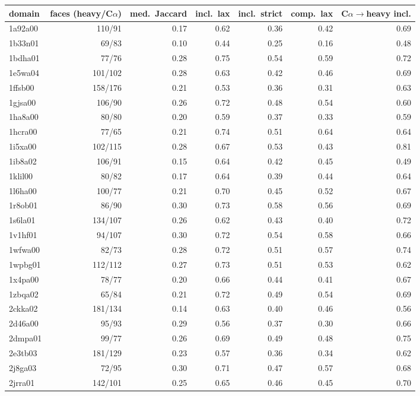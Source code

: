 \begin{table}[H]\centering\small\begin{tabular}{lrrrrrr}\toprule
domain & faces (heavy/C$\alpha$) & med.\ Jaccard & incl.\ lax & incl.\ strict & comp.\ lax & C$\alpha\to$heavy incl.\\\midrule
1a92a00 & 110/91 & 0.17 & 0.62 & 0.36 & 0.42 & 0.69\\
1b33n01 & 69/83 & 0.10 & 0.44 & 0.25 & 0.16 & 0.48\\
1bdha01 & 77/76 & 0.28 & 0.75 & 0.54 & 0.59 & 0.72\\
1e5wa04 & 101/102 & 0.28 & 0.63 & 0.42 & 0.46 & 0.69\\
1ffsb00 & 158/176 & 0.21 & 0.53 & 0.36 & 0.31 & 0.63\\
1gjsa00 & 106/90 & 0.26 & 0.72 & 0.48 & 0.54 & 0.60\\
1ha8a00 & 80/80 & 0.20 & 0.59 & 0.37 & 0.33 & 0.59\\
1hcra00 & 77/65 & 0.21 & 0.74 & 0.51 & 0.64 & 0.64\\
1i5xa00 & 102/115 & 0.28 & 0.67 & 0.53 & 0.43 & 0.81\\
1ib8a02 & 106/91 & 0.15 & 0.64 & 0.42 & 0.45 & 0.49\\
1klil00 & 80/82 & 0.17 & 0.64 & 0.39 & 0.44 & 0.64\\
1l6ha00 & 100/77 & 0.21 & 0.70 & 0.45 & 0.52 & 0.67\\
1r8ob01 & 86/90 & 0.30 & 0.73 & 0.58 & 0.56 & 0.69\\
1s6la01 & 134/107 & 0.26 & 0.62 & 0.43 & 0.40 & 0.72\\
1v1hf01 & 94/107 & 0.30 & 0.72 & 0.54 & 0.58 & 0.66\\
1wfwa00 & 82/73 & 0.28 & 0.72 & 0.51 & 0.57 & 0.74\\
1wpbg01 & 112/112 & 0.27 & 0.73 & 0.51 & 0.53 & 0.62\\
1x4pa00 & 78/77 & 0.20 & 0.66 & 0.44 & 0.41 & 0.67\\
1zbqa02 & 65/84 & 0.21 & 0.72 & 0.49 & 0.54 & 0.69\\
2ckka02 & 181/134 & 0.14 & 0.63 & 0.40 & 0.46 & 0.56\\
2d46a00 & 95/93 & 0.29 & 0.56 & 0.37 & 0.30 & 0.66\\
2dmpa01 & 99/77 & 0.26 & 0.69 & 0.49 & 0.48 & 0.75\\
2e3tb03 & 181/129 & 0.23 & 0.57 & 0.36 & 0.34 & 0.62\\
2j8ga03 & 72/95 & 0.30 & 0.71 & 0.47 & 0.57 & 0.68\\
2jrra01 & 142/101 & 0.25 & 0.65 & 0.46 & 0.45 & 0.70\\

\end{tabular}
\end{table}
